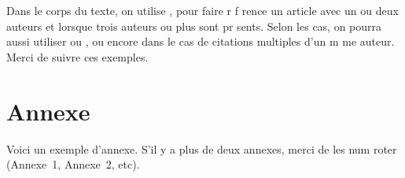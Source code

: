 \documentclass{article}
\begin{document}
Dans le corps du texte, on utilise \citet{thSau00}, \citet{HolWil90}
pour faire r f rence   un article avec un ou deux auteurs et
\citet{lioni01} lorsque trois auteurs ou plus sont pr sents.  Selon
les cas, on pourra aussi utiliser \citep{thSau00} ou
\citep[voir][chapitre 4]{brei:frie:olsh:ston:1984}, ou encore
\citet{quin:1986ID3,quin:1993} dans le cas de citations multiples
d'un m me auteur. Merci de suivre ces exemples.







\section*{Annexe}

Voici un exemple d'annexe. S'il y a plus de deux annexes, merci de
les num roter (Annexe~1, Annexe~2, etc).

\Fr
\end{document}
